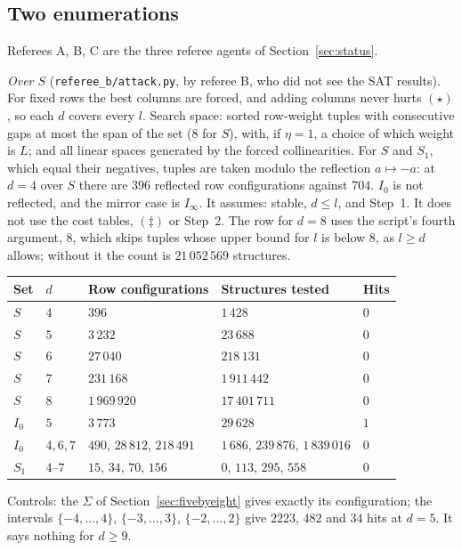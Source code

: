 \documentclass[11pt,a4paper]{article}
\theoremstyle{plain}
\theoremstyle{definition}
\newcommand{\Iz}{I_{0}}
\newcommand{\Ii}{I_{\infty}}
\newcommand{\scr}[1]{\nolinkurl{#1}}
\begin{document}
\subsection{Two enumerations}

Referees A, B, C are the three referee agents of Section~\ref{sec:status}.

\emph{Over $S$} (\scr{referee_b/attack.py}, by referee B, who did not see the SAT results). For fixed rows the best columns are forced, and adding columns never hurts $(\star)$, so each $d$ covers every $l$. Search space: sorted row-weight tuples with consecutive gaps at most the span of the set ($8$ for $S$), with, if $\eta=1$, a choice of which weight is $L$; and all linear spaces generated by the forced collinearities. For $S$ and $S_{1}$, which equal their negatives, tuples are taken modulo the reflection $a\mapsto-a$: at $d=4$ over $S$ there are $396$ reflected row configurations against $704$. $\Iz$ is not reflected, and the mirror case is $\Ii$. It assumes: stable, $d\le l$, and Step~1. It does not use the cost tables, $(\ddagger)$ or Step~2. The row for $d=8$ uses the script's fourth argument, $8$, which skips tuples whose upper bound for $l$ is below $8$, as $l\ge d$ allows; without it the count is $21\,052\,569$ structures.
\begin{center}
\begin{tabular}{lllll}
Set & $d$ & Row configurations & Structures tested & Hits\\\hline
$S$ & $4$ & $396$ & $1\,428$ & $0$\\
$S$ & $5$ & $3\,232$ & $23\,688$ & $0$\\
$S$ & $6$ & $27\,040$ & $218\,131$ & $0$\\
$S$ & $7$ & $231\,168$ & $1\,911\,442$ & $0$\\
$S$ & $8$ & $1\,969\,920$ & $17\,401\,711$ & $0$\\
$\Iz$ & $5$ & $3\,773$ & $29\,628$ & $1$\\
$\Iz$ & $4,6,7$ & $490$, $28\,812$, $218\,491$ & $1\,686$, $239\,876$, $1\,839\,016$ & $0$\\
$S_{1}$ & $4$--$7$ & $15$, $34$, $70$, $156$ & $0$, $113$, $295$, $558$ & $0$
\end{tabular}
\end{center}
Controls: the $\Sigma$ of Section~\ref{sec:fivebyeight} gives exactly its configuration; the intervals $\{-4,\dots,4\}$, $\{-3,\dots,3\}$, $\{-2,\dots,2\}$ give $2223$, $482$ and $34$ hits at $d=5$. It says nothing for $d\ge9$.
\end{document}
